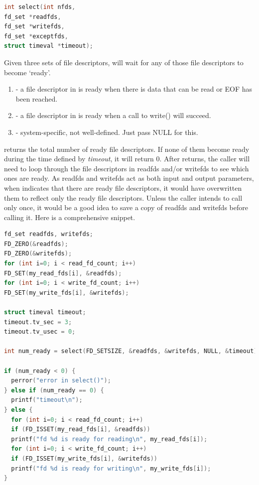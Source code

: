 \begin{lstlisting}[language=C]
int select(int nfds,
fd_set *readfds,
fd_set *writefds,
fd_set *exceptfds,
struct timeval *timeout);
\end{lstlisting}

Given three sets of file descriptors,  will wait for any of those file descriptors to become `ready'.

\begin{enumerate}
\item {} - a file descriptor in  is ready when there is data that can be read or EOF has been reached.

\item {} - a file descriptor in  is ready when a call to write() will succeed.

\item {} - system-specific, not well-defined.
  Just pass NULL for this.
\end{enumerate}

 returns the total number of ready file descriptors.
If none of them become ready during the time defined by \emph{timeout}, it will return 0.
After  returns, the caller will need to loop through the file descriptors in readfds and/or writefds to see which ones are ready.
As readfds and writefds act as both input and output parameters, when  indicates that there are ready file descriptors, it would have overwritten them to reflect only the ready file descriptors.
Unless the caller intends to call  only once, it would be a good idea to save a copy of readfds and writefds before calling it.
Here is a comprehensive snippet.

\begin{lstlisting}[language=C]
fd_set readfds, writefds;
FD_ZERO(&readfds);
FD_ZERO(&writefds);
for (int i=0; i < read_fd_count; i++)
FD_SET(my_read_fds[i], &readfds);
for (int i=0; i < write_fd_count; i++)
FD_SET(my_write_fds[i], &writefds);

struct timeval timeout;
timeout.tv_sec = 3;
timeout.tv_usec = 0;

int num_ready = select(FD_SETSIZE, &readfds, &writefds, NULL, &timeout);

if (num_ready < 0) {
  perror("error in select()");
} else if (num_ready == 0) {
  printf("timeout\n");
} else {
  for (int i=0; i < read_fd_count; i++)
  if (FD_ISSET(my_read_fds[i], &readfds))
  printf("fd %d is ready for reading\n", my_read_fds[i]);
  for (int i=0; i < write_fd_count; i++)
  if (FD_ISSET(my_write_fds[i], &writefds))
  printf("fd %d is ready for writing\n", my_write_fds[i]);
}
\end{lstlisting}

